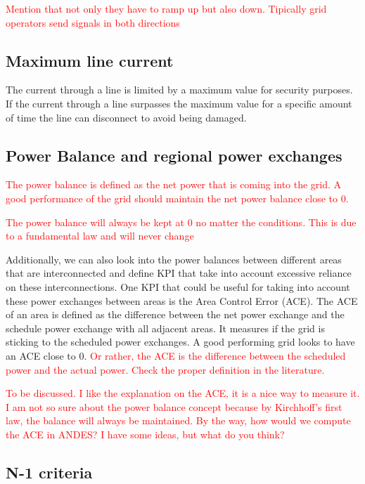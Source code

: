 \documentclass{article}
\begin{document}
\textcolor{red}{Mention that not only they have to ramp up but also down. Tipically grid operators send signals in both directions}


\subsection*{Maximum line current}

The current through a line is limited by a maximum value for security purposes. If the current through a line surpasses the maximum value for a specific amount of time the line can disconnect to avoid being damaged.

\subsection*{Power Balance and regional power exchanges}

\textcolor{red}{The power balance is defined as the net power that is coming into the grid. A good performance of the grid should maintain the net power balance close to 0.}

\textcolor{red}{The power balance will always be kept at 0 no matter the conditions. This is due to a fundamental law and will never change}

Additionally, we can also look into the power balances between different areas that are interconnected and define KPI that take into account excessive reliance on these interconnections. One KPI that could be useful for taking into account these power exchanges between areas is the Area Control Error (ACE). The ACE of an area is defined as the difference between the net power exchange and the schedule power exchange with all adjacent areas. It measures if the grid is sticking to the scheduled power exchanges. A good performing grid looks to have an ACE close to $0$.  \textcolor{red}{Or rather, the ACE is the difference between the scheduled power and the actual power. Check the proper definition in the literature.}

\textcolor{red}{To be discussed. I like the explanation on the ACE, it is a nice way to measure it. I am not so sure about the power balance concept because by Kirchhoff's first law, the balance will always be maintained. By the way, how would we compute the ACE in ANDES? I have some ideas, but what do you think?}

\subsection*{N-1 criteria}
\end{document}
